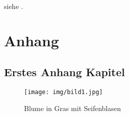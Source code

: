 \documentclass[11pt]{article}
\begin{document}



\tableofcontents
\newpage
\listoffigures
\newpage
\renewcommand*{\listoflistingscaption}{Listingverzeichnis}
\listoflistings
\newpage


siehe .

\printbibliography

\newpage

\appendix
\renewcommand{\thesubsection}{\Alph{\subsection}}
\renewcommand{\thefigure}{\thesubsection.\arabic{figure}}
\setcounter{figure}{0}
\label{lab:erster_anhang}

\section*{Anhang}
\subsection{Erstes Anhang Kapitel}

\begin{figure}[H]
    \centering
    \texttt{[image: img/bild1.jpg]}
    \caption[Blume]{Blume in Gras mit Seifenblasen}
    \label{fig:anhang_blume}
\end{figure}



\newpage



%


\setcounter{secnumdepth}{0}

\end{document}
